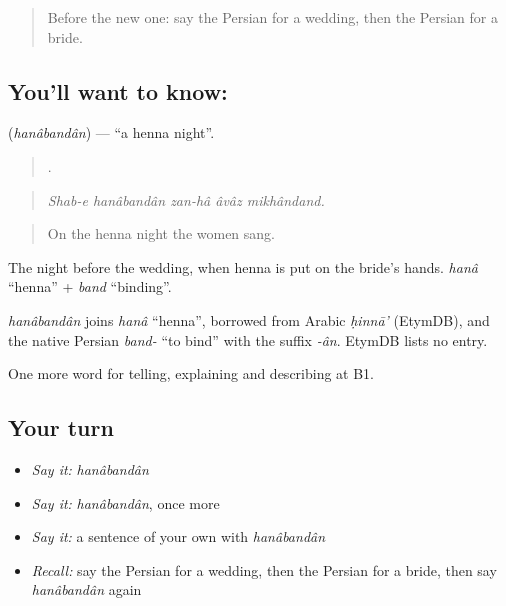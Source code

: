 \label{lesson:FA-C335-hanabandan}



\begin{quote}
Before the new one: say the Persian for a wedding, then the Persian for a bride.
\end{quote}

\subsection*{You'll want to know: }
\textbf{} (\emph{hanâbandân}) — \textquotedblleft{}a henna night\textquotedblright{}.

\begin{quote}
    .
\end{quote}

\begin{quote}
\emph{Shab-e hanâbandân zan-hâ âvâz mikhândand.}
\end{quote}

\begin{quote}
On the henna night the women sang.
\end{quote}

The night before the wedding, when henna is put on the bride's hands. \emph{hanâ} \textquotedblleft{}henna\textquotedblright{} + \emph{band} \textquotedblleft{}binding\textquotedblright{}.

\begin{cousinweb}
\emph{hanâbandân} joins \emph{hanâ} \textquotedblleft{}henna\textquotedblright{}, borrowed from Arabic \emph{ḥinnā'} (EtymDB), and the native Persian \emph{band-} \textquotedblleft{}to bind\textquotedblright{} with the suffix \emph{-ân}. EtymDB lists no entry.
\end{cousinweb}

\begin{grammarlens}[title={What you've built}]
One more word for telling, explaining and describing at B1.
\end{grammarlens}

\subsection*{Your turn}
\begin{itemize}
\raggedright
  \item \emph{Say it:} \emph{hanâbandân}
  \item \emph{Say it:} \emph{hanâbandân}, once more
  \item \emph{Say it:} a sentence of your own with \emph{hanâbandân}
  \item \emph{Recall:} say the Persian for a wedding, then the Persian for a bride, then say \emph{hanâbandân} again
\end{itemize}

